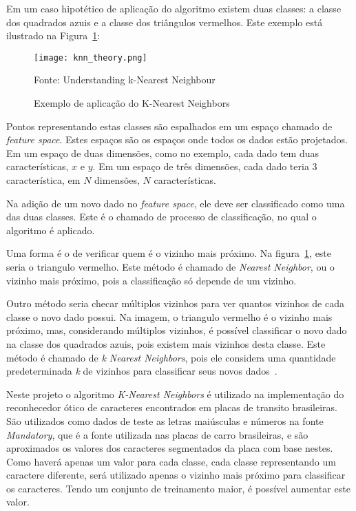 Em um caso hipotético de aplicação do algoritmo existem duas classes: a classe
dos quadrados azuis e a classe dos triângulos vermelhos. Este exemplo está
ilustrado na Figura~\ref{fig:knearest_example}:

\begin{figure}[H]
	\centering
	\texttt{[image: knn\_theory.png]}
	\caption{Exemplo de aplicação do K-Nearest Neighbors}
Fonte: Understanding k-Nearest Neighbour~\cite{opencv2014knearest}
	\label{fig:knearest_example}
\end{figure}

Pontos representando estas classes são espalhados em um espaço chamado de
\emph{feature space}. Estes espaços são os espaços onde todos os dados estão
projetados. Em um espaço de duas dimensões, como no exemplo, cada dado tem duas
características, $x$ e $y$. Em um espaço de três dimensões, cada dado teria 3
característica, em $N$ dimensões, $N$ características.

Na adição de um novo dado no \emph{feature space}, ele deve ser classificado
como uma das duas classes. Este é o chamado de processo de classificação, no
qual o algoritmo é aplicado.

Uma forma é o de verificar quem é o vizinho mais próximo. Na
figura~\ref{fig:knearest_example}, este seria o triangulo vermelho. Este método
é chamado de \emph{Nearest Neighbor}, ou o vizinho mais próximo, pois a
classificação só depende de um vizinho.

Outro método seria checar múltiplos vizinhos para ver quantos vizinhos de cada
classe o novo dado possui. Na imagem, o triangulo vermelho é o vizinho mais
próximo, mas, considerando múltiplos vizinhos, é possível classificar o novo
dado na classe dos quadrados azuis, pois existem mais vizinhos desta classe.
Este método é chamado de \emph{k Nearest Neighbors}, pois ele considera uma
quantidade predeterminada \emph{k} de vizinhos para classificar seus novos
dados~\cite{opencv2014knearest}.

Neste projeto o algoritmo \emph{K-Nearest Neighbors} é utilizado na
implementação do reconhecedor ótico de caracteres encontrados em placas de
transito brasileiras. São utilizados como dados de teste as letras maiúsculas e
números na fonte \emph{Mandatory}, que é a fonte utilizada nas placas de carro
brasileiras, e são aproximados os valores dos caracteres segmentados da placa
com base nestes. Como haverá apenas um valor para cada classe, cada classe
representando um caractere diferente, será utilizado apenas o vizinho mais
próximo para classificar os caracteres. Tendo um conjunto de treinamento maior,
é possível aumentar este valor.

